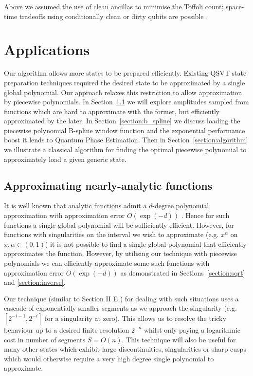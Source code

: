 \documentclass[aps,prx,twocolumn,floatfix,10pt,amssymb,amsfont,amsmath,superscriptaddress,float,nofootinbib,longbibliography,nobalancelastpage]{revtex4-2}
\theoremstyle{empty}
\begin{document}
Above we assumed the use of clean ancillas to minimise the Toffoli count; space-time tradeoffs using conditionally clean or dirty qubits are possible \cite{Khattar:2024pqa, Nie:2024key}.
\section{Applications}
\label{section:applications}
Our algorithm allows more states to be prepared efficiently. Existing QSVT state preparation techniques required the desired state to be approximated by a single global polynomial. Our approach relaxes this restriction to allow approximation by piecewise polynomials. In Section~\ref{section:nearly_analytic} we will explore amplitudes sampled from functions which are hard to approximate with the former, but efficiently approximated by the later. In Section~\ref{section:b_spline} we discuss loading the piecewise polynomial B-spline window function and the exponential performance boost it lends to Quantum Phase Estimation. Then in Section~\ref{section:algorithm} we illustrate a classical algorithm for finding the optimal piecewise polynomial to approximately load a given generic state. 

\subsection{Approximating nearly-analytic functions}
\label{section:nearly_analytic}
It is well known that analytic functions admit a $d$-degree polynomial approximation with approximation error $O(\exp(-d))$ \cite{Trefethen}. Hence for such functions a single global polynomial will be sufficiently efficient. However, for functions with singularities on the interval we wish to approximate (e.g. $x^\alpha$ on $x,\alpha\in(0,1)$) it is not possible to find a single global polynomial that efficiently approximates the function. However, by utilising our technique with piecewise polynomials we can efficiently approximate some such functions with approximation error $O\left(\exp(-d)\right)$ as demonstrated in Sections~\ref{section:sqrt} and \ref{section:inverse}.

Our technique (similar to Section II E \cite{Sanders_2020}) for dealing with such situations  uses a cascade of exponentially smaller segments as we approach the singularity (e.g. $[2^{-i-1}, 2^{-i}]$ for a singularity at zero). This allows us to resolve the tricky behaviour up to a desired finite resolution $2^{-n}$ whilst only paying a logarithmic cost in number of segments $S=O(n)$. This technique will also be useful for many other states which exhibit large discontinuities, singularities or sharp cusps which would otherwise require a very high degree single polynomial to approximate.
\end{document}
